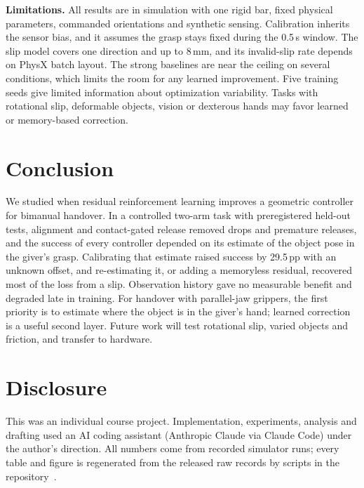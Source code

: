 \documentclass[conference,letterpaper]{IEEEtran}
\newcommand{\pp}{\,pp}
\begin{document}
\textbf{Limitations.} All results are in simulation with one rigid bar, fixed physical parameters, commanded
orientations and synthetic sensing. Calibration inherits the sensor bias, and it
assumes the grasp stays fixed during the 0.5\,s window. The slip model covers one direction and up to 8\,mm, and its invalid-slip rate
depends on PhysX batch layout. The strong baselines are near the ceiling on several conditions, which limits the room
for any learned improvement. Five training seeds give limited information about optimization variability. Tasks with
rotational slip, deformable objects, vision or dexterous hands may favor learned or memory-based correction.

\section{Conclusion}

We studied when residual reinforcement learning improves a geometric controller for bimanual handover. In a
controlled two-arm task with preregistered held-out tests, alignment and contact-gated release removed drops and
premature releases, and the success of every controller depended on its estimate of the object pose in the giver's
grasp. Calibrating that estimate raised success by 29.5\pp{} with an unknown offset, and re-estimating it, or adding a
memoryless residual, recovered most of the loss from a slip. Observation history gave no measurable benefit and
degraded late in training. For handover with parallel-jaw grippers, the first priority is to estimate where the
object is in the giver's hand; learned correction is a useful second layer. Future work will test rotational slip,
varied objects and friction, and transfer to hardware.

\section*{Disclosure}
This was an individual course project. Implementation, experiments, analysis and drafting used an AI coding
assistant (Anthropic Claude via Claude Code) under the author's direction. All numbers come from recorded simulator
runs; every table and figure is regenerated from the released raw records by scripts in the repository~\cite{repo2026}.



\end{document}
